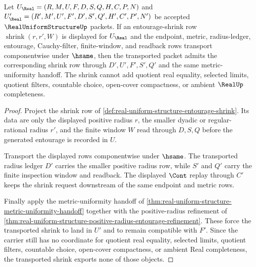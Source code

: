 \begin{theorem}
\label{thm:real-uniform-structure-entourage-shrink-stability}
Let $U_{\Real}=(R,M,U,F,D,S,Q,H,C,P,N)$ and $U'_{\Real}=(R',M',U',F',D',S',Q',H',C',P',N')$ be accepted $\RealUniformStructureUp$ packets. If an entourage-shrink row $\operatorname{shrink}(r,r',W)$ is displayed for $U_{\Real}$ and the endpoint, metric, radius-ledger, entourage, Cauchy-filter, finite-window, and readback rows transport componentwise under $\hsame$, then the transported packet admits the corresponding shrink row through $D',U',F',S',Q'$ and the same metric-uniformity handoff. The shrink cannot add quotient real equality, selected limits, quotient filters, countable choice, open-cover compactness, or ambient $\RealUp$ completeness.
\end{theorem}
\begin{proof}
Project the shrink row of \autoref{def:real-uniform-structure-entourage-shrink}. Its data are only the displayed positive radius $r$, the smaller dyadic or regular-rational radius $r'$, and the finite window $W$ read through $D,S,Q$ before the generated entourage is recorded in $U$.

Transport the displayed rows componentwise under $\hsame$. The transported radius ledger $D'$ carries the smaller positive radius row, while $S'$ and $Q'$ carry the finite inspection window and readback. The displayed $\Cont$ replay through $C'$ keeps the shrink request downstream of the same endpoint and metric rows.

Finally apply the metric-uniformity handoff of \autoref{thm:real-uniform-structure-metric-uniformity-handoff} together with the positive-radius refinement of \autoref{thm:real-uniform-structure-positive-radius-entourage-refinement}. These force the transported shrink to land in $U'$ and to remain compatible with $F'$. Since the carrier still has no coordinate for quotient real equality, selected limits, quotient filters, countable choice, open-cover compactness, or ambient Real completeness, the transported shrink exports none of those objects.
\end{proof}

